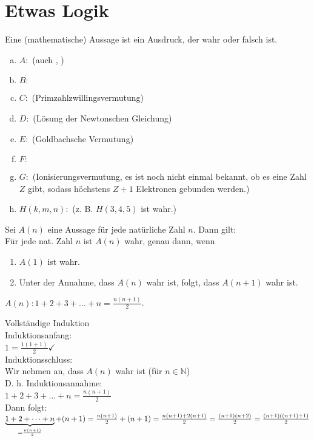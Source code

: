 \documentclass[../ana1.tex]{subfiles}
\begin{document}
\section{Etwas Logik}
\begin{prosa}
	Eine (mathematische) Aussage ist ein Ausdruck, der wahr oder falsch ist.
\end{prosa}
\begin{bspe}\leavevmode
	\begin{enumerate}[(a)]
		\item \(A :\)   (auch , )
		\item \(B :\) 
		\item \(C :\)  (Primzahlzwillingsvermutung)
		\item \(D :\)  (Lösung der Newtonschen Gleichung)
		\item \(E :\)  (Goldbachsche Vermutung)
		\item \(F :\) 
		\item \(G :\)  (Ionisierungsvermutung, es ist noch nicht einmal bekannt, ob es eine Zahl \(Z\) gibt, sodass höchstens \(Z+1\) Elektronen gebunden werden.)
		\item \(H(k,m,n) :\)  (z. B. \(H(3,4,5)\) ist wahr.)
	\end{enumerate}
\end{bspe}
Sei  \(A(n)\) eine Aussage für jede natürliche Zahl \(n\). Dann gilt:\\
Für jede nat. Zahl \(n\) ist \(A(n)\) wahr, genau dann, wenn
\begin{enumerate}
	\item \(A(1)\) ist wahr.
	\item Unter der Annahme, dass \(A(n)\) wahr ist, folgt, dass \(A(n+1)\) wahr ist.
\end{enumerate}
\begin{bsp}
	\(A(n): 1+2+3+\dots+n=\frac{n(n+1)}{2}\).
\end{bsp}
\begin{bew}
	Vollständige Induktion\\
	Induktionsanfang:\\
	\(1 = \frac{1(1+1)}{2} \checkmark\)\\
	Induktionsschluss:\\
	Wir nehmen an, dass \(A(n)\) wahr ist (für \(n\in\mathbb{N}\))\\
	D. h. Induktionsannahme:\\
	\(1+2+3+\dots+n=\frac{n(n+1)}{2}\)\\
	Dann folgt:\\
	\(\underbrace{1+2+\dots+n}_{=\frac{n(n+1)}{2}}+(n+1)=\frac{n(n+1)}{2}+(n+1) \\
	=\frac{n(n+1) + 2(n+1)}{2} = \frac{(n+1)(n+2)}{2} = \frac{(n+1)((n+1)+1)}{2}\)
\end{bew}
\end{document}
